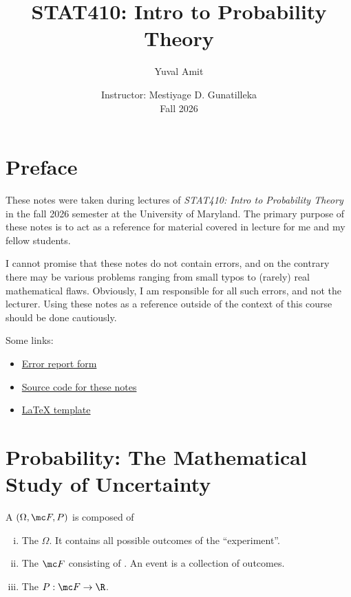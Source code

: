 \documentclass[11pt]{article}
\title{STAT410: Intro to Probability Theory}
\author{Yuval Amit}
\date{Instructor: Mestiyage D. Gunatilleka \\ Fall 2026}
\begin{document}
\maketitle

\section*{Preface}

\vspace{-0.5em}

These notes were taken during lectures of \textit{STAT410: Intro to Probability Theory} in the fall 2026 semester at the University of Maryland. The primary purpose of these notes is to act as a reference for material covered in lecture for me and my fellow students. 

I cannot promise that these notes do not contain errors, and on the contrary there may be various problems ranging from small typos to (rarely) real mathematical flaws. Obviously, I am responsible for all such errors, and not the lecturer. Using these notes as a reference outside of the context of this course should be done cautiously. 

Some links:
\begin{itemize}
    \item \href{https://docs.google.com/forms/d/e/1FAIpQLSdhZbMDXPyvQ3KKiL1MLr5d0WGBrnASU8-LFDA73ICSnwH_Og/viewform?usp=publish-editor}{Error report form}
    \item \href{https://github.com/YuvalAmit2/yuvals-notes/tree/main/stat410-notes}{Source code for these notes}
    \item \href{https://github.com/YuvalAmit2/yalatex}{LaTeX template}
\end{itemize}



\vspace{1em}

\tableofcontents


\newpage

\section{Probability: The Mathematical Study of Uncertainty}

\begin{defn}
    A  $(\Omega,\mc F,P)$ is composed of
    \begin{enumerate}[(i)]
        \item The  $\Omega$. It contains all possible outcomes of the ``experiment''.
        \item The  $\mc F$ consisting of . An event is a collection of outcomes.
        \item The  $P:\mc F \to \R$.
    \end{enumerate}
\end{defn}
\end{document}
